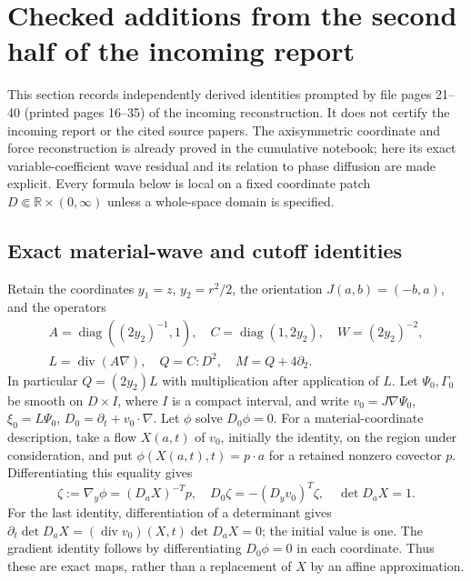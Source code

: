 \section{Checked additions from the second half of the incoming report}
\label{sec:wb-secondary}

This section records independently derived identities prompted by file pages
21--40 (printed pages 16--35) of the incoming reconstruction. It does not
certify the incoming report or the cited source papers. The axisymmetric
coordinate and force reconstruction is already proved in the cumulative
notebook; here its exact variable-coefficient wave residual and its relation
to phase diffusion are made explicit. Every formula below is local on a
fixed coordinate patch $D\Subset\mathbb R\times(0,\infty)$ unless a
whole-space domain is specified.

\subsection{Exact material-wave and cutoff identities}

Retain the coordinates $y_1=z$, $y_2=r^2/2$, the orientation
$J(a,b)=(-b,a)$, and the operators
\begin{gather*}
 A=\operatorname{diag}((2y_2)^{-1},1),\quad
 C=\operatorname{diag}(1,2y_2),\quad W=(2y_2)^{-2},\\
 L=\operatorname{div}(A\nabla),\quad Q=C:D^2,\quad M=Q+4\partial_2.
\end{gather*}
In particular $Q=(2y_2)L$ with multiplication after application of $L$.
Let $\Psi_0,\Gamma_0$ be smooth on $D\times I$, where $I$ is a
compact interval, and write $v_0=J\nabla\Psi_0$, $\xi_0=L\Psi_0$,
$D_0=\partial_t+v_0\cdot\nabla$. Let $\phi$ solve $D_0\phi=0$.
For a material-coordinate description, take a flow $X(a,t)$ of $v_0$,
initially the identity, on the region under consideration, and put
$\phi(X(a,t),t)=p\cdot a$ for a retained nonzero covector $p$.
Differentiating this equality gives
\[
 \zeta:=\nabla_y\phi=(D_aX)^{-T}p,
 \quad D_0\zeta=-(D_yv_0)^T\zeta,
 \quad \det D_aX=1.
\]
For the last identity, differentiation of a determinant gives
$\partial_t\det D_aX=(\operatorname{div}v_0)(X,t)\det D_aX=0$;
the initial value is one. The gradient identity follows by differentiating
$D_0\phi=0$ in each coordinate. Thus these are exact maps, rather than
a replacement of $X$ by an affine approximation.

